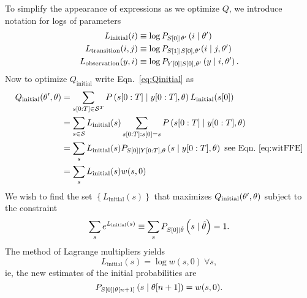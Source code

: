 To simplify the appearance of expressions as we optimize $Q$, we
introduce notation for logs of parameters
\begin{align}
  L_{\text{initial}}(i) & \equiv \log P_{{S}{[0]}\mid \theta'}
  \left(i\mid \theta' \right) \\
  L_{\text{transition}}(i,j) &\equiv \log P_{{S}{[1]} \mid 
    {S}{[0]},\theta'}({i}\mid j,\theta') \\
  \label{eq:Loutput}
  L_{\text{observation}}(y,i) & \equiv \log
  P_{{Y}{[0]}\mid {S}{[0]},\theta'} \left(y\mid i,\theta' \right).
\end{align}
Now to optimize $Q_{\text{initial}}$ write Eqn.~\eqref{eq:Qinitial} as
\begin{align}
  Q_{\text{initial}} (\parameters',\parameters) &=
  \sum_{\ts{s}{0}{T}\in\states^T} P
  \left(\ts{s}{0}{T}\given \ts{y}{0}{T},\parameters \right)
  L_{\text{initial}}(\ti{s}{0})\\
  &= \sum_{s \in \states} L_{\text{initial}}(s)
  \sum_{\ts{s}{0}{T}:\ti{s}{0}=s} P
  \left(\ts{s}{0}{T}\given \ts{y}{0}{T},\parameters \right)\\
  &= \sum_s L_{\text{initial}}(s) P_{\ti{S}{0}\given \ts{Y}{0}{T},\parameters}
  \left(s\given \ts{y}{0}{T},\parameters \right) \text{ see Eqn.~\eqref{eq:witFFE}}\\
  &= \sum_s L_{\text{initial}}(s) w(s,0)
\end{align}
We wish to find the set $\left\{ L_{\text{initial}}(s) \right\}$ that
maximizes $Q_{\text{initial}} (\theta',\theta)$ subject to the
constraint
\begin{equation*}
  \sum_s e^{ L_{\text{initial}}(s)} \equiv\sum_s
  P_{{S}{[0]}\mid \hat {\theta}} \left(s\mid \hat {\theta} \right) = 1.
\end{equation*}
The method of Lagrange multipliers yields
\begin{equation}
  \label{eq:LiSol}
   L_{\text{initial}}(s) = \log w(s,0) ~ \forall s,
\end{equation}
ie, the new estimates of the initial probabilities are
\begin{equation}
  \label{eq:InitialRe}
  P_{{S}{[0]}\mid {\theta}{[n+1]}} \left(s\mid {\theta}{[n+1]} \right) = w(s,0).
\end{equation}


